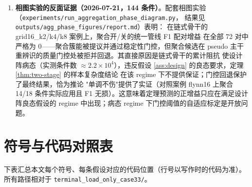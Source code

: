 \documentclass[UTF8,11pt]{ctexart}
\begin{document}
\begin{enumerate}[leftmargin=2em]
  \item \textbf{相图实验的反面证据（2026-07-21，144 条件）}。配套相图实验
        （\texttt{experiments/run\_aggregation\_phase\_diagram.py}，
        结果见 \texttt{outputs/agg\_phase\_figures/report.md}）表明：
        在链式骨干的 grid16\_k2/k4/k8 案例上，聚合开/关的统一管线 F1 配对增益
        在全部 72 对中严格为 $0$——聚合簇能被提议并通过稳定性门控，但聚合候选在
        pseudo 主干重辨识的质量门控处被拒并回退。其直接原因是链式骨干的累计阻抗
        使设计阵病态（实测条件数 $\approx 2.2\times 10^{4}$），违反假设
        \ref{ass:design} 的良态要求，定理 \ref{thm:two-stage} 的样本复杂度结论
        在该 regime 下不提供保证；门控回退保护了最终结果，恰为推论
        "单调不伤"提供了实证（对照案例 flynn16 上聚合 14/18 条件实际应用且
        F1 无损）。这意味着定理预测的正增益只应在满足设计阵良态假设的
        regime 中出现；病态 regime 下门控阈值的自适应标定是开放问题。
\end{enumerate}

\appendix

\section{符号与代码对照表}
\label{app:code-map}

下表汇总本文每个符号、每条假设对应的代码位置（行号以写作时的代码为准）。
所有路径相对于 \texttt{terminal\_load\_only\_case33/}。
\end{document}
